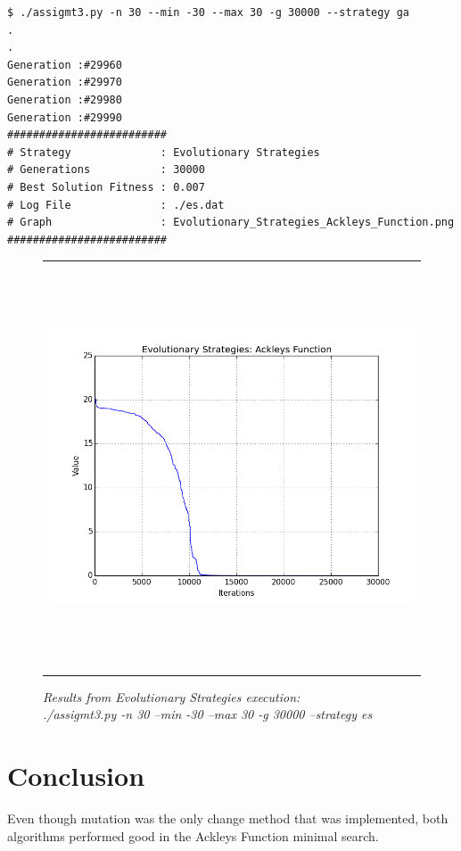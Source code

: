 \documentclass[]{spie}  %
\begin{document}
\begin{verbatim}
$ ./assigmt3.py -n 30 --min -30 --max 30 -g 30000 --strategy ga
.
.
Generation :#29960
Generation :#29970
Generation :#29980
Generation :#29990
#########################
# Strategy              : Evolutionary Strategies
# Generations           : 30000
# Best Solution Fitness : 0.007
# Log File              : ./es.dat
# Graph                 : Evolutionary_Strategies_Ackleys_Function.png
#########################

\end{verbatim}

\begin{figure} [ht]
\begin{center}
\begin{tabular}{c} 
\includegraphics[height=12cm]{Evolutionary_Strategies_Ackleys_Function.png}
\end{tabular}
\end{center}
\caption[es_results] 
{ \label{fig:image-es} 
\textit{Results from Evolutionary Strategies execution: \\
./assigmt3.py -n 30 --min -30 --max 30 -g 30000 --strategy es}}
\end{figure} 

\section{Conclusion}

Even though mutation was the only change method that was implemented, both algorithms performed good in the Ackleys Function minimal search.
\end{document}
